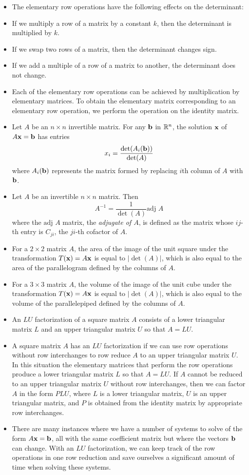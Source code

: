 \begin{itemize}
\item The elementary row operations have the following effects on the determinant:
\ba \item If we multiply a row of a matrix by a constant $k$, then the determinant is multiplied by $k$.
\item If we swap two rows of a matrix, then the determinant changes sign.
\item If we add a multiple of a row of a matrix to another, the determinant does not change.
\ea
\item Each of the elementary row operations can be achieved by multiplication by elementary matrices. To obtain the elementary matrix corresponding to an elementary row operation, we perform the operation on the identity matrix.
\item Let $A$ be an $n\times n$ invertible matrix. For any $\mathbf{b}$ in $\mathbb{R}^n$, the solution $\mathbf{x}$ of $A\mathbf{x}=\mathbf{b}$ has entries
\[ x_i =\frac{\det(A_i(\mathbf{b}))}{\det(A)} \]
where $A_i(\mathbf{b})$ represents the matrix formed by replacing $i$th column of $A$ with $\mathbf{b}$.
\item Let $A$ be an invertible $n\times n$ matrix. Then 
\[ A^{-1} = \frac{1}{\det(A)} \text{adj } A \]
where the $\text{adj } A$ matrix, the \emph{adjugate of $A$}, is defined as the matrix whose $ij$-th entry is $C_{ji}$, the $ji$-th cofactor of $A$.
\item For a $2\times 2$ matrix $A$, the area of the image of the unit square under the transformation $T(\mathbf{x})=A\mathbf{x}$ is equal to $|\det(A)|$, which is also equal to the area of the parallelogram defined by the columns of $A$. 
\item For a $3\times 3$ matrix $A$, the volume of the image of the unit cube under the transformation $T(\mathbf{x})=A\mathbf{x}$ is equal to $|\det(A)|$, which is also equal to the volume of the parallelepiped defined by the columns of $A$. 
\item An $LU$ factorization of a square matrix $A$ consists of a lower triangular matrix $L$ and an upper triangular matrix $U$ so that $A = LU$. 
\item A square matrix $A$ has an $LU$ factorization if we can use row operations without row interchanges to row reduce $A$ to an upper triangular matrix $U$. In this situation the elementary matrices that perform the row operations produce a lower triangular matrix $L$ so that $A = LU$. If $A$ cannot be reduced to an upper triangular matrix $U$ without row interchanges, then we can factor $A$ in the form $PLU$, where $L$ is a lower triangular matrix, $U$ is an upper triangular matrix, and $P$ is obtained from the identity matrix by appropriate row interchanges.  
\item There are many instances where we have a number of systems to solve of the form $A \mathbf{x} = \mathbf{b}$, all with the same coefficient matrix but where the vectors $\mathbf{b}$ can change. With an $LU$ factorization, we can keep track of the row operations in one row reduction and save ourselves a significant amount of time when solving these systems. 
\end{itemize}

